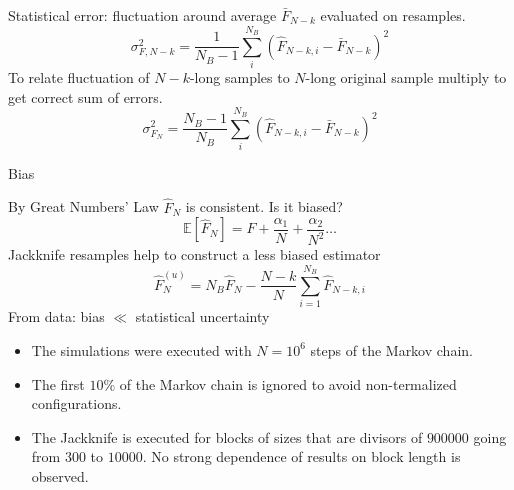 \documentclass[12pt,handout]{beamer}
\begin{document}
\begin{frame}
\begin{center}
Statistical error: fluctuation around average $\bar{F}_{N-k}$ evaluated on resamples.
\[
\sigma_{F, N-k}^2 = \frac{1}{N_B-1}\sum_i ^{N_B} \left(\hat{F}_{N-k, i} - \bar{F}_{N-k}\right)^2
\]
To relate fluctuation of $N-k$-long samples to $N$-long original sample multiply to get correct sum of errors.
\[
\sigma_{F_N}^2 = \frac{N_B-1}{N_B}\sum_i ^{N_B} \left(\hat{F}_{N-k, i} - \bar{F}_{N-k}\right)^2
\]
\end{center}
\end{frame}

\begin{frame}{Bias}
\begin{center}
By Great Numbers' Law $\hat{F}_N$ is consistent. Is it biased?
\[
	\mathbb E \left[\hat{F}_N\right] = F + \frac{\alpha_1}{N} + \frac{\alpha _2}{N^2} \ldots 
\]
Jackknife resamples help to construct a less biased estimator
\[
	\hat{F}^{\left(u\right)} _N = N_B\hat{F}_N - \frac{N-k}{N} \sum_{i = 1} ^ {N_B} \hat{F}_{N-k, i}
\]
From data: bias $\ll$ statistical uncertainty

\end{center}
\end{frame}


\begin{frame}
\begin{center}
\begin{itemize}
\item The simulations were executed with $N = 10^6$ steps of the Markov chain.\\
\vspace{10pt}
\item The first $10\%$ of the Markov chain is ignored to avoid non-termalized configurations.\\
\vspace{10pt}
\item The Jackknife is executed for blocks of sizes that are divisors of $900000$ going from $300$ to $10000$. No strong dependence of results on block length is observed.\\
\end{itemize}
\end{center}
\end{frame}
\end{document}
